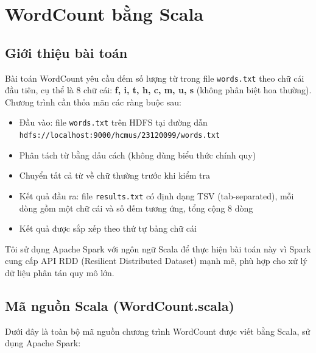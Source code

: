 \documentclass[12pt,a4paper]{article}
\begin{document}
\clearpage
\section{WordCount bằng Scala}

\subsection{Giới thiệu bài toán}

Bài toán WordCount yêu cầu đếm số lượng từ trong file \texttt{words.txt} theo chữ
cái đầu tiên, cụ thể là 8 chữ cái: \textbf{f, i, t, h, c, m, u, s} (không phân
biệt hoa thường). Chương trình cần thỏa mãn các ràng buộc sau:

\begin{itemize}
  \item Đầu vào: file \texttt{words.txt} trên HDFS tại đường dẫn
        \texttt{hdfs://localhost:9000/hcmus/23120099/words.txt}
  \item Phân tách từ bằng dấu cách (không dùng biểu thức chính quy)
  \item Chuyển tất cả từ về chữ thường trước khi kiểm tra
  \item Kết quả đầu ra: file \texttt{results.txt} có định dạng TSV (tab-separated),
        mỗi dòng gồm một chữ cái và số đếm tương ứng, tổng cộng 8 dòng
  \item Kết quả được sắp xếp theo thứ tự bảng chữ cái
\end{itemize}

Tôi sử dụng Apache Spark với ngôn ngữ Scala để thực hiện bài toán này vì Spark cung
cấp API RDD (Resilient Distributed Dataset) mạnh mẽ, phù hợp cho xử lý dữ liệu
phân tán quy mô lớn.

\subsection{Mã nguồn Scala (WordCount.scala)}

Dưới đây là toàn bộ mã nguồn chương trình WordCount được viết bằng Scala, sử dụng
Apache Spark:
\end{document}
